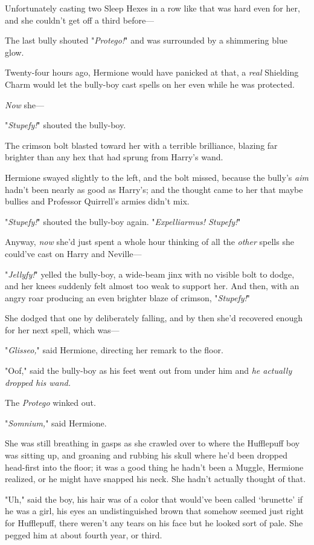 Unfortunately casting two Sleep Hexes in a row like that was hard even for her,
and she couldn't get off a third before---

The last bully shouted "\emph{Protego!}" and was surrounded by a shimmering
blue glow.

Twenty-four hours ago, Hermione would have panicked at that, a \emph{real}
Shielding Charm would let the bully-boy cast spells on her even while he was
protected.

\emph{Now} she---

"\emph{Stupefy!}" shouted the bully-boy.

The crimson bolt blasted toward her with a terrible brilliance, blazing far
brighter than any hex that had sprung from Harry's wand.

Hermione swayed slightly to the left, and the bolt missed, because the bully's
\emph{aim} hadn't been nearly as good as Harry's; and the thought came to her
that maybe bullies and Professor Quirrell's armies didn't mix.

"\emph{Stupefy!}" shouted the bully-boy again. "\emph{Expelliarmus! Stupefy!}"

Anyway, \emph{now} she'd just spent a whole hour thinking of all the
\emph{other} spells she could've cast on Harry and Neville---

"\emph{Jellyfy!}" yelled the bully-boy, a wide-beam jinx with no visible bolt
to dodge, and her knees suddenly felt almost too weak to support her. And then,
with an angry roar producing an even brighter blaze of crimson,
"\emph{Stupefy!}"

She dodged that one by deliberately falling, and by then she'd recovered enough
for her next spell, which was---

"\emph{Glisseo,}" said Hermione, directing her remark to the floor.

"Oof," said the bully-boy as his feet went out from under him and \emph{he
actually dropped his wand.}

The \emph{Protego} winked out.

"\emph{Somnium,}" said Hermione.

She was still breathing in gasps as she crawled over to where the Hufflepuff
boy was sitting up, and groaning and rubbing his skull where he'd been dropped
head-first into the floor; it was a good thing he hadn't been a Muggle,
Hermione realized, or he might have snapped his neck. She hadn't actually
thought of that.

"Uh," said the boy, his hair was of a color that would've been called
`brunette' if he was a girl, his eyes an undistinguished brown that somehow
seemed just right for Hufflepuff, there weren't any tears on his face but he
looked sort of pale. She pegged him at about fourth year, or third.


